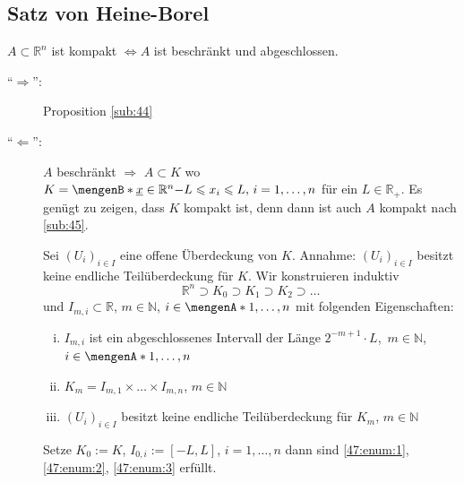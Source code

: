 \subsection{Satz von Heine-Borel} %
\label{sub:47}
$A \subset \mathds{R}^n$ ist kompakt $\iff A $ ist beschränkt und abgeschlossen.
\begin{description}
	\item[\enquote{$\Rightarrow$}:] Proposition \ref{sub:44}
	\item[\enquote{$\Leftarrow$}:] $A$ beschränkt $\Rightarrow $ $A \subset K$ wo $K = \set[\underline{x} \in \mathds{R}^n]{- L \le x_i \le L,\, i=1,\ldots ,n} $ 
	für ein $L \in \mathds{R}_+$. Es genügt zu zeigen, dass $K$ kompakt ist, denn dann ist auch $A$ kompakt nach \ref{sub:45}.
	
	Sei $(U_i)_{i \in I}$ eine offene Überdeckung von $K$. Annahme: $(U_i)_{i \in I}$ besitzt keine endliche Teilüberdeckung für $K$. Wir konstruieren induktiv
	\[
		\mathds{R}^n \supset K_0 \supset K_1 \supset K_2 \supset \ldots 
	\]
	und $I_{m,i} \subset \mathds{R}$, $m \in \mathds{N}$, $i \in \set{1, \ldots ,n} $ mit folgenden Eigenschaften:
	\begin{enumerate}[(i)]
		\item \label{47:enum:1} $I_{m,i}$ ist ein abgeschlossenes Intervall der Länge $2^{-m+1} \cdot L$, $\, m \in \mathds{N}$, $i \in  \set{1, \ldots ,n} $
		\item \label{47:enum:2} $K_m = I_{m,1} \times \ldots \times I_{m,n}$, $m \in \mathds{N}$
		\item \label{47:enum:3}$(U_i)_{i \in I}$ besitzt keine endliche Teilüberdeckung für $K_m$, $m \in \mathds{N}$
	\end{enumerate}
	\begin{figure}[ht]
	\end{figure}
	Setze $K_0 := K $, $I_{0,i} := [-L,L]$, $i=1,\ldots ,n$ dann sind \ref{47:enum:1}, \ref{47:enum:2}, \ref{47:enum:3} erfüllt.
	

\end{description}
